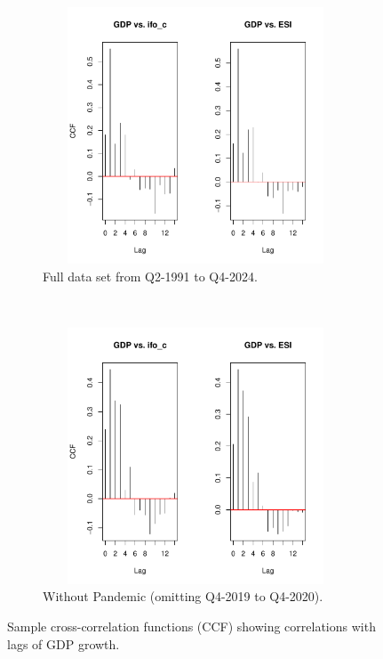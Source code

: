 \documentclass[11pt,a4paper]{article}
\begin{document}
\begin{figure}[ht]
    \begin{subfigure}[htpb]{\textwidth}
        \begin{center}
            \includegraphics[height=3in, width=4.5in]{./Figures/CCF.pdf}
            \caption{Full data set from Q2-1991 to Q4-2024.\label{CCF}}
        \end{center}
    \end{subfigure}
    \\
    \begin{subfigure}[htpb]{\textwidth}
        \begin{center}
            \includegraphics[height=3in, width=4.5in]{./Figures/CCF_wc.pdf}
            \caption{Without Pandemic (omitting Q4-2019 to Q4-2020).\label{CCF_wc}}
        \end{center}
    \end{subfigure}
    \caption{Sample cross-correlation functions (CCF) showing correlations with lags of GDP growth.}
\end{figure}
\end{document}
